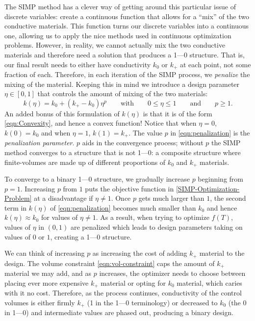 The SIMP method has a clever way of getting around this particular issue of discrete variables: create a continuous function that allows for a ``mix'' of the two conductive materials. This function turns our discrete variables into a continuous one, allowing us to apply the nice methods used in continuous optimization problems. However, in reality, we cannot actually mix the two conductive materials and therefore need a solution that produces a 1---0 structure. That is, our final result needs to either have conductivity $k_0$ or $k_+$ at each point, not some fraction of each. Therefore, in each iteration of the SIMP process, we \textit{penalize} the mixing of the material. Keeping this in mind we introduce a design parameter $\eta\in\left[0,1\right]$ that controls the amount of mixing of the two materials:
\begin{equation}
	k\left(\eta\right)=k_0+\left(k_+-k_0\right)\eta^p\qquad\text{with}\qquad 0\leq\eta\leq 1\qquad\text{and}\qquad p\geq1.\label{eqn:penalization}
\end{equation}
An added bonus of this formulation of $k(\eta)$ is that it is of the form \eqref{eqn:Convexity}, and hence a convex function! Notice that when $\eta=0$, $k\left(0\right)=k_0$ and when $\eta=1$, $k\left(1\right)=k_+$. The value $p$ in \eqref{eqn:penalization} is the \textit{penalization parameter}. $p$ aids in the convergence process; without $p$ the SIMP method converges to a structure that is not 1---0: a composite structure where finite-volumes are made up of different proportions of $k_0$ and $k_+$ materials.

To converge to a binary 1---0 structure, we gradually increase $p$ beginning from $p=1$. Increasing $p$ from $1$ puts the objective function in \eqref{SIMP-Optimization-Problem} at a disadvantage if $\eta\neq1$. Once $p$ gets much larger than $1$, the second term in $k(\eta)$ of \eqref{eqn:penalization} becomes much smaller than $k_0$ and hence $k(\eta)\approx k_0$ for values of $\eta\neq1$. As a result, when trying to optimize $f(T)$, values of $\eta$ in $(0,1)$ are penalized which leads to design parameters taking on values of $0$ or $1$, creating a 1---0 structure.

We can think of increasing $p$ as increasing the cost of adding $k_+$ material to the design. The volume constraint \eqref{eqn:vol-constraint} caps the amount of $k_+$ material we may add, and as $p$ increases, the optimizer needs to choose between placing ever more expensive $k_+$ material or opting for $k_0$ material, which caries with it no cost. Therefore, as the process continues, conductivity of the control volumes is either firmly $k_+$ (1 in the 1---0 terminology) or decreased to $k_0$ (the 0 in 1---0) and intermediate values are phased out, producing a binary design.

